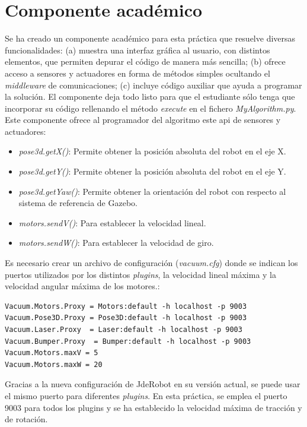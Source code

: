 \section{Componente académico}
Se ha creado un componente académico para esta práctica que resuelve diversas funcionalidades: (a) muestra una interfaz gráfica al usuario, con distintos elementos, que permiten depurar el código de manera más sencilla; (b) ofrece acceso a sensores y actuadores en forma de métodos simples ocultando el \textit{middleware} de comunicaciones; (c) incluye código auxiliar que ayuda a programar la solución. El componente deja todo listo para que el estudiante sólo tenga que incorporar su código rellenando el método \textit{execute} en el fichero \textit{MyAlgorithm.py}.\\

Este componente ofrece al programador del algoritmo este \acrshort{api} de sensores y actuadores:

\begin{itemize}
\item 	\textit{pose3d.getX()}: Permite obtener la posición absoluta del robot en el eje X.
\item	\textit{pose3d.getY()}: Permite obtener la posición absoluta del robot en el eje Y.
\item	\textit{pose3d.getYaw()}: Permite obtener la orientación del robot con respecto al sistema de referencia de Gazebo.
\item 	\textit{motors.sendV()}: Para establecer la velocidad lineal.
\item	\textit{motors.sendW()}: Para establecer la velocidad de giro.
\end{itemize}

Es necesario crear un archivo de configuración (\textit{vacuum.cfg}) donde se indican los puertos utilizados por los distintos \textit{plugins}, la velocidad lineal máxima y la velocidad angular máxima de los motores.:

\vspace{20pt}
	\begin{lstlisting}[frame=single]
Vacuum.Motors.Proxy = Motors:default -h localhost -p 9003
Vacuum.Pose3D.Proxy = Pose3D:default -h localhost -p 9003
Vacuum.Laser.Proxy  = Laser:default -h localhost -p 9003
Vacuum.Bumper.Proxy  = Bumper:default -h localhost -p 9003
Vacuum.Motors.maxV = 5
Vacuum.Motors.maxW = 20
	\end{lstlisting}

Gracias a la nueva configuración de JdeRobot en su versión actual, se puede usar el mismo puerto para diferentes \textit{plugins}. En esta práctica, se emplea el puerto 9003 para todos los plugins y se ha establecido la velocidad máxima de tracción y de rotación.\\

